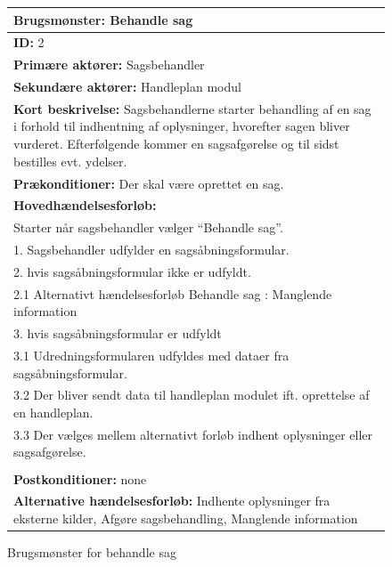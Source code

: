 \begin{figure} [htb!]
\begin{longtable}{|p{18cm}|}
\hline
\textbf{Brugsmønster:} Behandle sag \\
\hline
\textbf{ID:} 2\\
\hline
\textbf{Primære aktører:} Sagsbehandler\\
\hline
\textbf{Sekundære aktører:} Handleplan modul\\
\hline
\textbf{Kort beskrivelse:}  Sagsbehandlerne starter behandling af en sag i forhold til indhentning af oplysninger, hvorefter sagen bliver vurderet. Efterfølgende kommer en sagsafgørelse og til sidst bestilles evt. ydelser. \\
\hline
\textbf{Prækonditioner:} Der skal være oprettet en sag. \\
\hline
\textbf{Hovedhændelsesforløb:}\\
Starter når sagsbehandler vælger “Behandle sag”.\\
1. Sagsbehandler udfylder en sagsåbningsformular.\\
2. hvis sagsåbningsformular ikke er udfyldt.\\
2.1 Alternativt hændelsesforløb Behandle sag : Manglende information\\
3. hvis sagsåbningsformular er udfyldt\\
3.1 Udredningsformularen udfyldes med dataer fra  sagsåbningsformular.\\
3.2 Der bliver sendt data til handleplan modulet ift. oprettelse af en handleplan. \\
3.3 Der vælges mellem alternativt forløb indhent oplysninger eller sagsafgørelse.\\
\\
\hline
\textbf{Postkonditioner: }none\\
\hline
\textbf{Alternative hændelsesforløb: }Indhente oplysninger fra eksterne kilder, Afgøre sagsbehandling, Manglende information\\
\hline
\end{longtable}
\label{tab:2}
\caption{Brugsmønster for behandle sag}
\end{figure}

